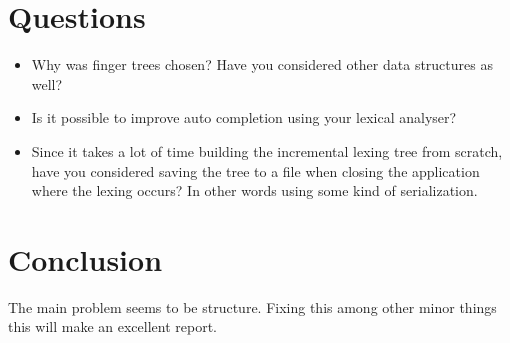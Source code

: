 \documentclass{article}
\begin{document}
\section{Questions}
\begin{itemize}
\item Why was finger trees chosen? Have you considered other data structures as
well?
\item Is it possible to improve auto completion using your lexical analyser?
\item Since it takes a lot of time building the incremental lexing tree from
scratch, have you considered saving the tree to a file when closing the
application where the lexing occurs? In other words using some kind of
serialization.
\end{itemize}

\section{Conclusion}
The main problem seems to be structure. Fixing this among other minor things
this will make an excellent report.
\end{document}
